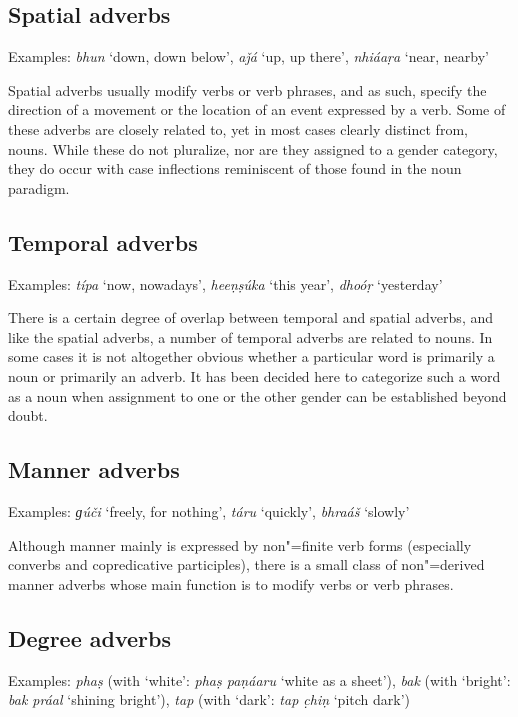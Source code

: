 \subsection{Spatial adverbs}
\label{subsec:3b-5-1}
Examples: \textit{bhun} `down, down below', \textit{aǰá} `up, up there', \textit{nhiáaṛa} `near, nearby'


Spatial adverbs usually modify verbs or verb phrases, and as such, specify the direction of a movement or the location of an event expressed by a verb. Some of these adverbs are closely related to, yet in most cases clearly distinct from, nouns. While these do not pluralize, nor are they assigned to a gender category, they do occur with case inflections reminiscent of those found in the noun paradigm. 


\subsection{Temporal adverbs}
\label{subsec:3b-5-2}
Examples: \textit{típa} `now, nowadays', \textit{heeṇṣúka} `this year', \textit{dhoóṛ} `yesterday'


There is a certain degree of overlap between temporal and spatial adverbs, and like the spatial adverbs, a number of temporal adverbs are related to nouns. In some cases it is not altogether obvious whether a particular word is primarily a noun or primarily an adverb. It has been decided here to categorize such a word as a noun when assignment to one or the other gender can be established beyond doubt.


\subsection{Manner adverbs}
\label{subsec:3b-5-3}
Examples: \textit{ɡúči} `freely, for nothing', \textit{táru} `quickly', \textit{bhraáš} `slowly'


Although manner mainly is expressed by non"=finite verb forms (especially converbs and copredicative participles), there is a small class of non"=derived manner adverbs whose main function is to modify verbs or verb phrases.


\subsection{Degree adverbs}
\label{subsec:3b-5-4}
Examples: \textit{phaṣ} (with `white': \textit{phaṣ paṇáaru} `white as a sheet'), \textit{bak} (with `bright': \textit{bak práal} `shining bright'), \textit{tap} (with `dark': \textit{tap c̣hiṇ} `pitch dark')


